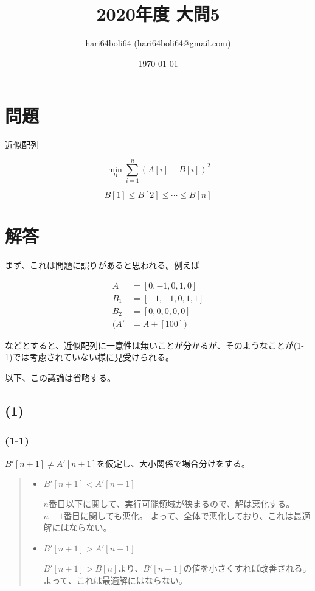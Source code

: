 \documentclass[a4paper, 10pt, dvipdfmx]{jlreq}
\begin{document}
\title{2020年度 大問5}
\author{hari64boli64 (hari64boli64@gmail.com)}
\date{\today}
\maketitle


\section{問題}

近似配列

\begin{equation*}
  \min_{B} \sum_{i=1}^{n}{(A[i]-B[i])^2}
\end{equation*}

$$
  B[1]\leq B[2] \leq \cdots \leq B[n]
$$

\section{解答}

まず、これは問題に誤りがあると思われる。例えば

\begin{align*}
  A   & =[0,-1,0,1,0]  \\
  B_1 & =[-1,-1,0,1,1] \\
  B_2 & =[0,0,0,0,0]   \\
  (A' & =A+[100])
\end{align*}

などとすると、近似配列に一意性は無いことが分かるが、そのようなことが(1-1)では考慮されていない様に見受けられる。

以下、この議論は省略する。

\subsection*{(1)}

\subsubsection*{(1-1)}

$B'[n+1] \neq A'[n+1]$を仮定し、大小関係で場合分けをする。

\begin{quote}
  \begin{itemize}
    \item  $B'[n+1] < A'[n+1]$

          $n$番目以下に関して、実行可能領域が狭まるので、解は悪化する。
          $n+1$番目に関しても悪化。
          よって、全体で悪化しており、これは最適解にはならない。

    \item  $B'[n+1] > A'[n+1]$

          $B'[n+1]>B[n]$より、$B'[n+1]$の値を小さくすれば改善される。
          よって、これは最適解にはならない。
  \end{itemize}
\end{quote}
\end{document}
